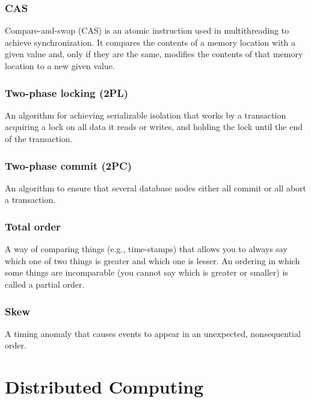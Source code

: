 \documentclass{article}
\begin{document}
    \subsubsection{CAS}
    Compare-and-swap (CAS) is an atomic instruction used in multithreading to achieve synchronization. It compares the contents of a memory location with a given value and, only if they are the same, modifies the contents of that memory location to a new given value.
    
    \subsubsection{Two-phase locking (2PL)}
    An algorithm for achieving serializable isolation that works by a transaction acquiring a lock on all data it reads or writes, and holding the lock until the end of the transaction.
    
    \subsubsection{Two-phase commit (2PC)}
    An algorithm to ensure that several database nodes either all commit or all abort a transaction.
    
    \subsubsection{Total order}
    A way of comparing things (e.g., time-stamps) that allows you to always say which one of two things is greater and which one is lesser. An ordering in which some things are incomparable (you cannot say which is greater or smaller) is called a partial order.
    
    \subsubsection{Skew}
    A timing anomaly that causes events to appear in an unexpected, nonsequential order.
    
\section{Distributed Computing}
\end{document}
